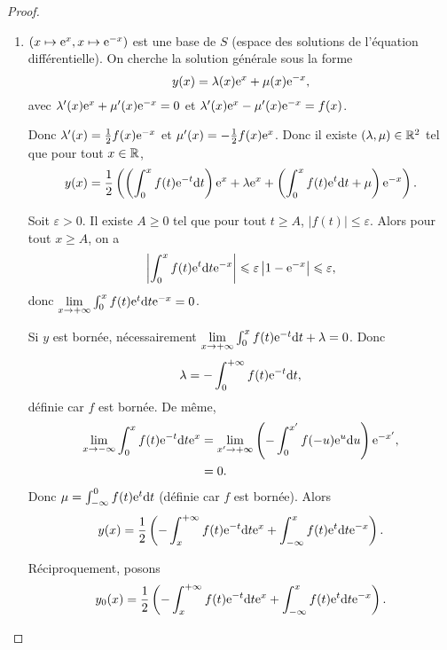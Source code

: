 \documentclass[12pt]{article}
\begin{document}
\begin{proof}
	\phantom{}
	\begin{enumerate}
		\item $(x\mapsto\mathrm{e}^{x},x\mapsto\mathrm{e}^{-x})$ est une base de $S$ (espace des solutions de l'équation différentielle). On cherche la solution générale sous la forme 
		\begin{equation}
			y(x)=\lambda(x)\mathrm{e}^{x}+\mu(x)\mathrm{e}^{-x},
		\end{equation}
		avec $\lambda'(x)\mathrm{e}^{x}+\mu'(x)\mathrm{e}^{-x}=0$ et $\lambda'(x)\mathrm{e}^{x}-\mu'(x)\mathrm{e}^{-x}=f(x)$.

		Donc $\lambda'(x)=\frac{1}{2}f(x)\mathrm{e}^{-x}$ et $\mu'(x)=-\frac{1}{2}f(x)\mathrm{e}^{x}$. Donc il existe $(\lambda,\mu)\in\mathbb{R}^{2}$ tel que pour tout $x\in\mathbb{R}$,
		\begin{equation}
			y(x)=\frac{1}{2}\left(\left(\int_{0}^{x}f(t)\mathrm{e}^{-t}\mathrm{d} t\right)\mathrm{e}^{x}+\lambda\mathrm{e}^{x}+\left(\int_{0}^{x}f(t)\mathrm{e}^{t}\mathrm{d} t+\mu\right)\mathrm{e}^{-x}\right).
		\end{equation}

		Soit $\varepsilon>0$. Il existe $A\geqslant0$ tel que pour tout $t\geqslant A$, $\left\lvert f(t)\right\rvert\leqslant\varepsilon$. Alors pour tout $x\geqslant A$, on a 
		\begin{equation}
			\left\lvert\int_{0}^{x}f(t)\mathrm{e}^{t}\mathrm{d} t\mathrm{e}^{-x}\right\rvert\leqslant\varepsilon\left\lvert 1-\mathrm{e}^{-x}\right\rvert\leqslant\varepsilon,
		\end{equation}
		donc $\lim\limits_{x\to+\infty}\int_{0}^{x}f(t)\mathrm{e}^{t}\mathrm{d} t\mathrm{e}^{-x}=0$.

		Si $y$ est bornée, nécessairement $\lim\limits_{x\to+\infty}\int_{0}^{x}f(t)\mathrm{e}^{-t}\mathrm{d} t+\lambda=0$. Donc 
		\begin{equation}
			\lambda=-\int_{0}^{+\infty}f(t)\mathrm{e}^{-t}\mathrm{d} t,
		\end{equation}
		définie car $f$ est bornée. De même, 
		\begin{align}
			\lim\limits_{x\to-\infty}\int_{0}^{x}f(t)\mathrm{e}^{-t}\mathrm{d} t\mathrm{e}^{x}
			&=\lim\limits_{x'\to+\infty}\left(-\int_{0}^{x'}f(-u)\mathrm{e}^{u}\mathrm{d} u\right)\mathrm{e}^{-x'},\\
			&=0.
		\end{align}
		Donc $\mu=\int_{-\infty}^{0}f(t)\mathrm{e}^{t}\mathrm{d} t$ (définie car $f$ est bornée). Alors 
		\begin{equation}
			y(x)=\frac{1}{2}\left(-\int_{x}^{+\infty}f(t)\mathrm{e}^{-t}\mathrm{d} t\mathrm{e}^{x}+\int_{-\infty}^{x}f(t)\mathrm{e}^{t}\mathrm{d} t\mathrm{e}^{-x}\right).
		\end{equation}

		Réciproquement, posons 
		\begin{equation}
			y_0(x)=\frac{1}{2}\left(-\int_{x}^{+\infty}f(t)\mathrm{e}^{-t}\mathrm{d} t\mathrm{e}^{x}+\int_{-\infty}^{x}f(t)\mathrm{e}^{t}\mathrm{d} t\mathrm{e}^{-x}\right).
		\end{equation}


\end{enumerate}
\end{proof}
\end{document}
